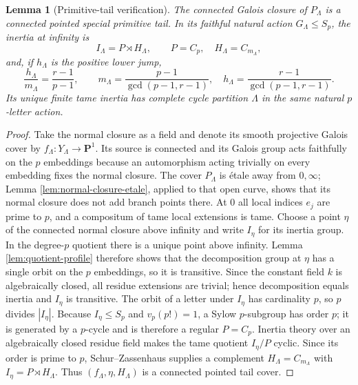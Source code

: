 \documentclass[10pt,a4paper]{amsart}
\newtheorem{lemma}[theorem]{Lemma}
\numberwithin{equation}{section}
\begin{document}
\begin{lemma}[Primitive-tail verification]\label{lem:primitive-tail}
The connected Galois closure of $P_\Lambda$ is a connected pointed special
primitive tail.  In its faithful natural action $G_\Lambda\leq S_p$, the
inertia at infinity is
\[
 I_\Lambda=P\rtimes H_\Lambda,\qquad
 P=C_p,\quad H_\Lambda=C_{m_\Lambda},
 \label{eq:primitive-inertia}
\]
and, if $h_\Lambda$ is the positive lower jump,
\[
 \frac{h_\Lambda}{m_\Lambda}
 =\frac{r-1}{p-1},\qquad
 m_\Lambda=\frac{p-1}{\gcd(p-1,r-1)},\quad
 h_\Lambda=\frac{r-1}{\gcd(p-1,r-1)}.
 \label{eq:primitive-type}
\]
Its unique finite tame inertia has complete cycle partition $\Lambda$ in
the same natural $p$-letter action.
\end{lemma}

\begin{proof}
Take the normal closure as a field and denote its smooth projective Galois
cover by $f_\Lambda:Y_\Lambda\to\mathbf P^1$.  Its source is connected and
its Galois group acts faithfully on the $p$ embeddings because an
automorphism acting trivially on every embedding fixes the normal closure.
The cover $P_\Lambda$ is étale away from $0,\infty$; Lemma
\ref{lem:normal-closure-etale}, applied to that open curve, shows that its
normal closure does not add branch points there.  At $0$ all local indices
$e_j$ are prime to $p$, and a compositum of tame local extensions is tame.
Choose a point $\eta$ of the connected normal closure above infinity and
write $I_\eta$ for its inertia group.  In the degree-$p$ quotient there is a
unique point above infinity.  Lemma \ref{lem:quotient-profile} therefore
shows that the decomposition group at $\eta$ has a single orbit on the $p$
embeddings, so it is transitive.  Since the
constant field $k$ is algebraically closed, all residue extensions are
trivial; hence decomposition equals inertia and $I_\eta$ is transitive.
The orbit of a letter under $I_\eta$ has cardinality $p$, so $p$ divides
$|I_\eta|$.  Because $I_\eta\leq S_p$ and $v_p(p!)=1$, a Sylow
$p$-subgroup has order $p$; it is generated by a $p$-cycle and is therefore
a regular $P=C_p$.  Inertia theory over an algebraically closed residue
field makes the tame quotient $I_\eta/P$ cyclic.  Since its order is prime
to $p$, Schur--Zassenhaus supplies a complement
$H_\Lambda=C_{m_\Lambda}$ with
$I_\eta=P\rtimes H_\Lambda$.  Thus
$(f_\Lambda,\eta,H_\Lambda)$ is a connected pointed tail cover.


\end{proof}
\end{document}
